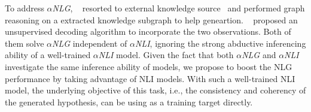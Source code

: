 


 
To address $\alpha$\textit{NLG}, ~\citet{grf} resorted to external knowledge source~\citep{conceptnet,atomic}
and performed graph reasoning on a extracted knowledge subgraph to help geneartion.
~\citet{backtofuture} proposed an unsupervised decoding algorithm to incorporate the two observations.
Both of them solve $\alpha$\textit{NLG} independent of $\alpha$\textit{NLI}, ignoring the strong abductive
inferencing ability of a well-trained $\alpha$\textit{NLI} model.
Given the fact that both $\alpha$\textit{NLG} and $\alpha$\textit{NLI} investigate the same inference 
ability of models, we propose to boost the NLG performance by taking advantage of NLI models. 
With such a well-trained NLI model, the underlying objective of this task, i.e., the consistency and 
coherency of the generated hypothesis, can be using as a training target directly.

